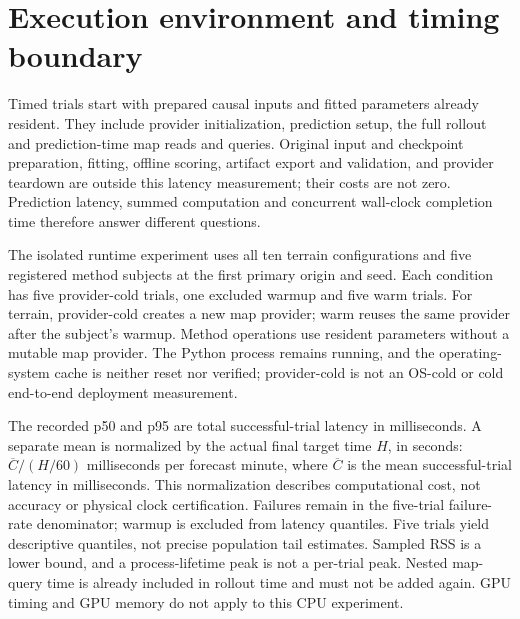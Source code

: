 \section{Execution environment and timing boundary}
\label{sec:runtime-environment}\hypertarget{sec:runtime-environment}{}
Timed trials start with prepared causal inputs and fitted parameters already
resident. They include provider initialization, prediction setup, the full
rollout and prediction-time map reads and queries. Original input and
checkpoint preparation, fitting, offline scoring, artifact export and
validation, and provider teardown are outside this latency measurement;
their costs are not zero. Prediction latency, summed computation and
concurrent wall-clock completion time therefore answer different questions.

The isolated runtime experiment uses all ten terrain configurations and five
registered method subjects at the first primary origin and seed. Each condition
has five provider-cold trials, one excluded warmup and five warm trials.
For terrain, provider-cold creates a new map provider; warm reuses the same
provider after the subject's warmup. Method operations use resident parameters
without a mutable map provider. The Python process remains running, and the
operating-system cache is neither reset nor verified; provider-cold is not
an OS-cold or cold end-to-end deployment measurement.

The recorded p50 and p95 are total successful-trial latency in milliseconds.
A separate mean is normalized by the actual final target time \(H\), in
seconds: \(\overline C/(H/60)\) milliseconds per forecast minute, where
\(\overline C\) is the mean successful-trial latency in milliseconds.
This normalization describes computational cost, not accuracy or physical
clock certification. Failures remain in the five-trial failure-rate
denominator; warmup is excluded from latency quantiles. Five trials yield
descriptive quantiles, not precise population tail estimates. Sampled RSS
is a lower bound, and a process-lifetime peak is not a per-trial peak.
Nested map-query time is already included in rollout time and must not be
added again. GPU timing and GPU memory do not apply to this CPU experiment.

